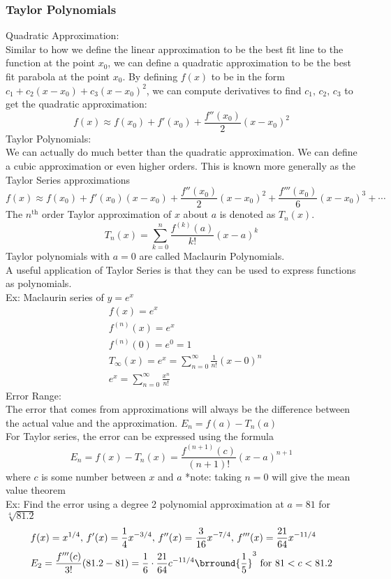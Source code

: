 \subsubsection{Taylor Polynomials}
Quadratic Approximation:\\
Similar to how we define the linear approximation to be the best fit line to the function at the point $x_0$, we can define a quadratic approximation to be the best fit parabola at the point $x_0$. By defining $f(x)$ to be in the form $c_1+c_2(x-x_0)+c_3(x-x_0)^2$, we can compute derivatives to find $c_1,\,c_2,\,c_3$ to get the quadratic approximation:
$$f(x)\approx f(x_0)+f'(x_0)+\frac{f''(x_0)}{2}(x-x_0)^2$$
Taylor Polynomials:\\
We can actually do much better than the quadratic approximation. We can define a cubic approximation or even higher orders. This is known more generally as the Taylor Series approximations
$$f(x)\approx f(x_0)+f'(x_0)(x-x_0)+\frac{f''(x_0)}{2}(x-x_0)^2+\frac{f'''(x_0)}{6}(x-x_0)^3+\cdots$$
The $n^\text{th}$ order Taylor approximation of $x$ about $a$ is denoted as $T_n(x)$.
$$T_n(x)=\sum_{k=0}^n\frac{f^{(k)}(a)}{k!}(x-a)^k$$
Taylor polynomials with $a=0$ are called Maclaurin Polynomials.\\
A useful application of Taylor Series is that they can be used to express functions as polynomials.\\
Ex: Maclaurin series of $y=e^x$
\begin{align*}
    &f(x)=e^x\\
    &f^{(n)}(x)=e^x\\
    &f^{(n)}(0)=e^0=1\\
    &T_\infty(x)=e^x=\sum_{n=0}^\infty\frac{1}{n!}(x-0)^n\\
    &e^x=\sum_{n=0}^\infty\frac{x^n}{n!}
\end{align*}
Error Range:\\
The error that comes from approximations will always be the difference between the actual value and the approximation. $E_n=f(a)-T_n(a)$\\
For Taylor series, the error can be expressed using the formula
$$E_n=f(x)-T_n(x)=\frac{f^{(n+1)}(c)}{(n+1)!}(x-a)^{n+1}$$
where $c$ is some number between $x$ and $a$
*note: taking $n=0$ will give the mean value theorem\\
Ex: Find the error using a degree 2 polynomial approximation at $a=81$ for $\sqrt[4]{81.2}$
\begin{align*}
    &f(x)=x^{1/4},\,f'(x)=\frac{1}{4}x^{-3/4},\,f''(x)=\frac{3}{16}x^{-7/4},\,f'''(x)=\frac{21}{64}x^{-11/4}\\
    &E_2=\frac{f'''(c)}{3!}(81.2-81)=\frac{1}{6}\cdot\frac{21}{64}c^{-11/4}\brround{\frac{1}{5}}^3\text{ for $81<c<81.2$}
\end{align*}

